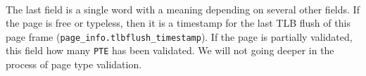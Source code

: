 \paragraph{}
The last field is a single word with a meaning depending on several other
fields.
If the page is free or typeless, then it is a timestamp for the last TLB flush
of this page frame (\texttt{page\_info.tlbflush\_timestamp}).
If the page is partially validated, this field how many \texttt{PTE} has been
validated.
We will not going deeper in the process of page type validation.
